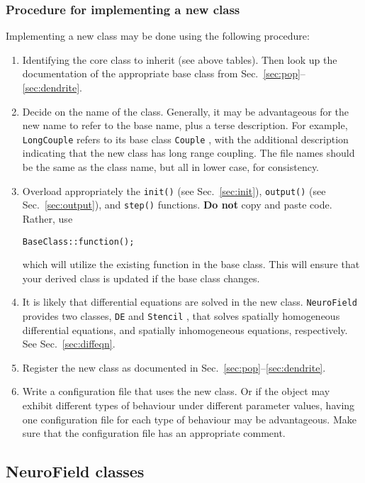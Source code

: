 \documentclass[12pt,a4paper]{article}
\newcommand{\type}[1]{{\small\small\tt #1} }
\newcommand{\NF}[0]{\type{NeuroField}}
\begin{document}
\subsubsection{Procedure for implementing a new class}

Implementing a new class may be done using the following procedure:
\begin{enumerate}
	\item Identifying the core class to inherit (see above tables). Then look up the documentation of the appropriate base class from Sec.~\ref{sec:pop}--\ref{sec:dendrite}.
	\item Decide on the name of the class. Generally, it may be advantageous for the new name to refer to the base name, plus a terse description. For example, \type{LongCouple} refers to its base class \type{Couple}, with the additional description indicating that the new class has long range coupling. The file names should be the same as the class name, but all in lower case, for consistency.
	\item Overload appropriately the \type{init()} (see Sec.~\ref{sec:init}), \type{output()} (see Sec.~\ref{sec:output}), and \type{step()} functions. {\bf Do not} copy and paste code. Rather, use
		\begin{lstlisting}
BaseClass::function();
		\end{lstlisting}
	which will utilize the existing function in the base class. This will ensure that your derived class is updated if the base class changes. 
	\item It is likely that differential equations are solved in the new class. \NF provides two classes, \type{DE} and \type{Stencil}, that solves spatially homogeneous differential equations, and spatially inhomogeneous equations, respectively. See Sec.~\ref{sec:diffeqn}.
	\item Register the new class as documented in Sec.~\ref{sec:pop}--\ref{sec:dendrite}.
	\item Write a configuration file that uses the new class. Or if the object may exhibit different types of behaviour under different parameter values, having one configuration file for each type of behaviour may be advantageous. Make sure that the configuration file has an appropriate comment.
\end{enumerate}

\subsection{NeuroField classes}
\end{document}
